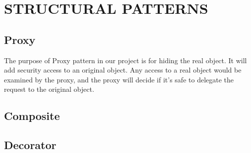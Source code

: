 \section{STRUCTURAL PATTERNS}

\subsection{Proxy}
The purpose of Proxy pattern in our project is for hiding the real object. It will add security access to an original object. Any access to a real object would be examined by the proxy, and the proxy will decide if it's safe to delegate the request to the original object. 

\paragraph{}


\subsection{Composite}

\subsection{Decorator}